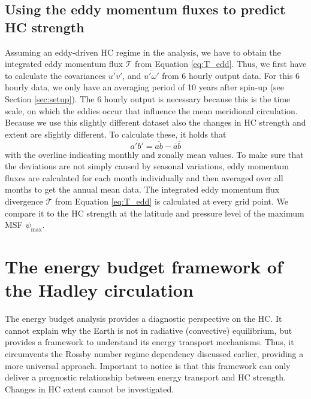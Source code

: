 \subsection{Using the eddy momentum fluxes to predict HC strength}
\label{sec:meth_eddy}
Assuming an eddy-driven HC regime in the analysis, we have to obtain the integrated eddy momentum flux $\mathcal{T}$ from Equation \eqref{eq:T_edd}. Thus, we first have to calculate the covariances $\overline{u'v'}$, and $\overline{u'\omega'}$ from 6 hourly output data. For this 6 hourly data, we only have an averaging period of 10 years after spin-up (see Section \ref{sec:setup}). The 6 hourly output is necessary because this is the time scale, on which the eddies occur that influence the mean meridional circulation. Because we use this slightly different dataset also the changes in HC strength and extent are slightly different.
To calculate these, it holds that
\begin{equation*}
    \overline{a'b'}=\overline{ab}-\overline{a}\overline{b}
\end{equation*}
with the overline indicating monthly and zonally mean values. To make sure that the deviations are not simply caused by seasonal variations, eddy momentum fluxes are calculated for each month individually and then averaged over all months to get the annual mean data. The integrated eddy momentum flux divergence $\mathcal{T}$ from Equation \ref{eq:T_edd} is calculated at every grid point. We compare it to the HC strength at the latitude and pressure level of the maximum MSF $\psi_\mathrm{max}$.

\section{The energy budget framework of the Hadley circulation}\label{sec:theo_energy}
The energy budget analysis provides a diagnostic perspective on the HC. It cannot explain why the Earth is not in radiative (convective) equilibrium, but provides a framework to understand its energy transport mechanisms. Thus, it circumvents the Rossby number regime dependency discussed earlier, providing a more universal approach. Important to notice is that this framework can only deliver a prognostic relationship between energy transport and HC strength. Changes in HC extent cannot be investigated.

